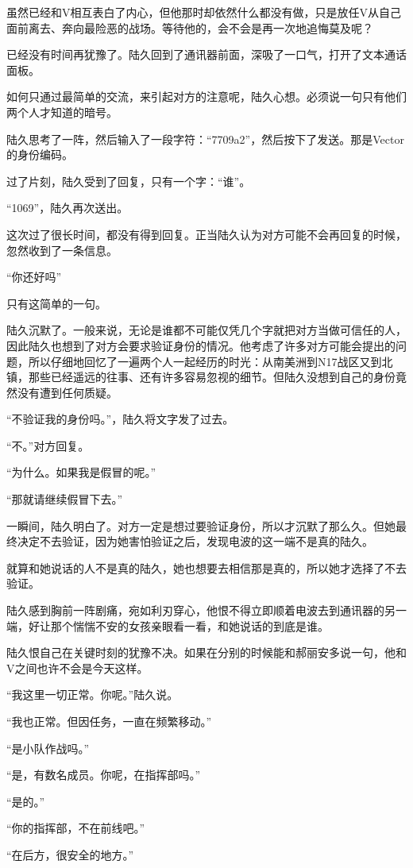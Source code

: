 虽然已经和V相互表白了内心，但他那时却依然什么都没有做，只是放任V从自己面前离去、奔向最险恶的战场。等待他的，会不会是再一次地追悔莫及呢？

已经没有时间再犹豫了。陆久回到了通讯器前面，深吸了一口气，打开了文本通话面板。

如何只通过最简单的交流，来引起对方的注意呢，陆久心想。必须说一句只有他们两个人才知道的暗号。

陆久思考了一阵，然后输入了一段字符：“7709a2”，然后按下了发送。那是Vector的身份编码。

过了片刻，陆久受到了回复，只有一个字：“谁”。

“1069”，陆久再次送出。

这次过了很长时间，都没有得到回复。正当陆久认为对方可能不会再回复的时候，忽然收到了一条信息。

“你还好吗”

只有这简单的一句。 

陆久沉默了。一般来说，无论是谁都不可能仅凭几个字就把对方当做可信任的人，因此陆久也想到了对方会要求验证身份的情况。他考虑了许多对方可能会提出的问题，所以仔细地回忆了一遍两个人一起经历的时光：从南美洲到N17战区又到北镇，那些已经遥远的往事、还有许多容易忽视的细节。但陆久没想到自己的身份竟然没有遭到任何质疑。

“不验证我的身份吗。”，陆久将文字发了过去。

“不。”对方回复。

“为什么。如果我是假冒的呢。”

“那就请继续假冒下去。”

一瞬间，陆久明白了。对方一定是想过要验证身份，所以才沉默了那么久。但她最终决定不去验证，因为她害怕验证之后，发现电波的这一端不是真的陆久。

就算和她说话的人不是真的陆久，她也想要去相信那是真的，所以她才选择了不去验证。

陆久感到胸前一阵剧痛，宛如利刃穿心，他恨不得立即顺着电波去到通讯器的另一端，好让那个惴惴不安的女孩亲眼看一看，和她说话的到底是谁。

陆久恨自己在关键时刻的犹豫不决。如果在分别的时候能和郝丽安多说一句，他和V之间也许不会是今天这样。

“我这里一切正常。你呢。”陆久说。

“我也正常。但因任务，一直在频繁移动。”

“是小队作战吗。”

“是，有数名成员。你呢，在指挥部吗。”

“是的。”

“你的指挥部，不在前线吧。”

“在后方，很安全的地方。”

